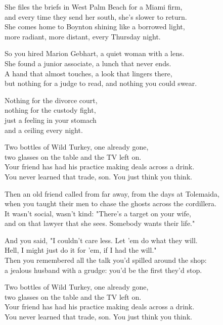 \begin{lyrics}

She files the briefs in West Palm Beach for a Miami firm,\\
and every time they send her south, she's slower to return.\\
She comes home to Boynton shining like a borrowed light,\\
more radiant, more distant, every Thursday night.

So you hired Marion Gebhart, a quiet woman with a lens.\\
She found a junior associate, a lunch that never ends.\\
A hand that almost touches, a look that lingers there,\\
but nothing for a judge to read, and nothing you could swear.

Nothing for the divorce court,\\
nothing for the custody fight,\\
just a feeling in your stomach\\
and a ceiling every night.

Two bottles of Wild Turkey, one already gone,\\
two glasses on the table and the TV left on.\\
Your friend has had his practice making deals across a drink.\\
You never learned that trade, son. You just think you think.

Then an old friend called from far away, from the days at Tolemaida,\\
when you taught their men to chase the ghosts across the cordillera.\\
It wasn't social, wasn't kind: "There's a target on your wife,\\
and on that lawyer that she sees. Somebody wants their life."

And you said, "I couldn't care less. Let 'em do what they will.\\
Hell, I might just do it for 'em, if I had the will."\\
Then you remembered all the talk you'd spilled around the shop:\\
a jealous husband with a grudge: you'd be the first they'd stop.

Two bottles of Wild Turkey, one already gone,\\
two glasses on the table and the TV left on.\\
Your friend has had his practice making deals across a drink.\\
You never learned that trade, son. You just think you think.


\end{lyrics}
